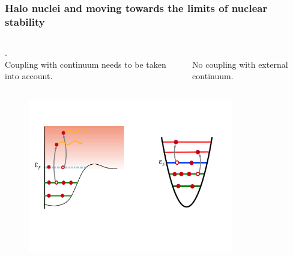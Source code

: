 \documentclass[compress]{beamer}
\begin{document}
\frame
{
  \frametitle{Halo nuclei and moving towards the limits of nuclear stability}
  \begin{footnotesize}
   
    \begin{columns}
      \column{4.3cm}
      
      \begin{block}{}
	{}. \\
	Coupling with continuum needs to be taken into account. 
      \end{block}

      \column{4.3cm}
      \begin{block}{}
	{}\\ 
	No coupling with external continuum. 
      \end{block}
    \end{columns}
  
  \begin{figure}[htp]
    \centering
    \includegraphics[width=0.8\textwidth]{Figures/fermisurface_unbound.pdf}
  \end{figure}
  
\end{footnotesize}
}
\end{document}
